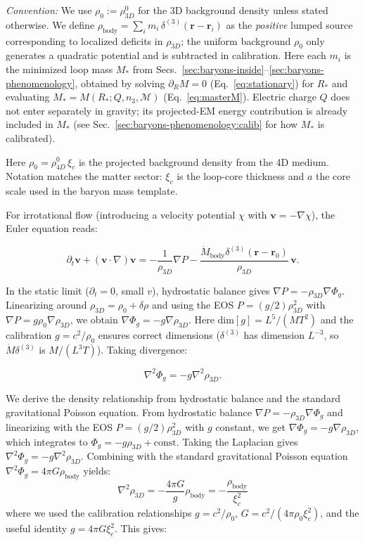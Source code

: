 \noindent\textit{Convention:} We use $\rho_0 := \rho_{3D}^0$ for the 3D background density unless stated otherwise.
We define $\rho_{\text{body}} = \sum_i m_i \, \delta^{(3)}(\mathbf r - \mathbf r_i)$ as the \emph{positive} lumped source corresponding to localized deficits in $\rho_{3D}$; the uniform background $\rho_0$ only generates a quadratic potential and is subtracted in calibration.
Here each $m_i$ is the minimized loop mass $M_\ast$ from Secs.~\ref{sec:baryons-inside}--\ref{sec:baryons-phenomenology}, obtained by solving $\partial_R M=0$ (Eq.~\ref{eq:stationary}) for $R_\ast$ and evaluating $M_\ast=M(R_\ast;Q,n_3,\mathcal M)$ (Eq.~\ref{eq:masterM}). Electric charge $Q$ does not enter separately in gravity; its projected-EM energy contribution is already included in $M_\ast$ (see Sec.~\ref{sec:baryons-phenomenology:calib} for how $M_\ast$ is calibrated).

Here $\rho_0 = \rho_{4D}^0 \, \xi_c$ is the projected background density from the 4D medium. Notation matches the matter sector: $\xi_c$ is the loop-core thickness and $a$ the core scale used in the baryon mass template.

For irrotational flow (introducing a velocity potential $\chi$ with $\mathbf{v} = -\nabla \chi$), the Euler equation reads:

\[
\partial_t \mathbf{v} + (\mathbf{v} \cdot \nabla) \mathbf{v} = -\frac{1}{\rho_{3D}} \nabla P - \frac{\dot{M}_{\text{body}} \delta^{(3)}(\mathbf{r} - \mathbf{r}_0)}{\rho_{3D}}\,\mathbf{v}.
\]

In the static limit ($\partial_t = 0$, small $v$), hydrostatic balance gives $\nabla P = -\rho_{3D} \nabla \Phi_g$. Linearizing around $\rho_{3D} = \rho_0 + \delta\rho$ and using the EOS $P = (g/2)\rho_{3D}^2$ with $\nabla P = g \rho_0 \nabla \rho_{3D}$, we obtain $\nabla \Phi_g = -g \nabla \rho_{3D}$. Here $\mathrm{dim}[g] = L^5/(MT^2)$ and the calibration $g = c^2/\rho_0$ ensures correct dimensions ($\delta^{(3)}$ has dimension $L^{-3}$, so $\dot{M} \delta^{(3)}$ is $M/(L^3 T)$). Taking divergence:

\[
\nabla^2 \Phi_g = -g \nabla^2 \rho_{3D}.
\]

We derive the density relationship from hydrostatic balance and the standard gravitational Poisson equation. From hydrostatic balance $\nabla P = -\rho_{3D} \nabla \Phi_g$ and linearizing with the EOS $P = (g/2)\rho_{3D}^2$ with $g$ constant, we get $\nabla \Phi_g = -g \nabla \rho_{3D}$, which integrates to $\Phi_g = -g \rho_{3D} + \text{const}$. Taking the Laplacian gives $\nabla^2 \Phi_g = -g \nabla^2 \rho_{3D}$. Combining with the standard gravitational Poisson equation $\nabla^2 \Phi_g = 4\pi G \rho_{\text{body}}$ yields:
\[
\nabla^2 \rho_{3D} = -\frac{4\pi G}{g} \rho_{\text{body}} = -\frac{\rho_{\text{body}}}{\xi_c^2}
\]
where we used the calibration relationships $g = c^2 / \rho_0$, $G = c^2 / (4\pi \rho_0 \xi_c^2)$, and the useful identity $g = 4\pi G \xi_c^2$. This gives:

